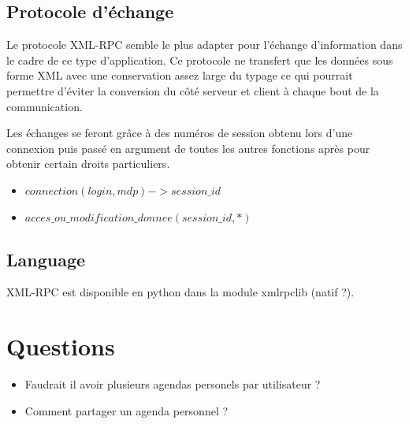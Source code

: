 \documentclass[a4paper,12pt]{article}
\begin{document}
\subsection{Protocole d'échange}

Le protocole XML-RPC semble le plus adapter pour l'échange d'information dans le cadre de ce type d'application. Ce protocole ne transfert que les données sous forme XML avec une conservation assez large du typage ce qui pourrait permettre d'éviter la conversion du côté serveur et client à chaque bout de la communication.

Les échanges se feront grâce à des numéros de session obtenu lors d'une connexion puis passé en argument de toutes les autres fonctions après pour obtenir certain droits particuliers.

\begin{itemize}
	\item $connection(login, mdp) -> session\_id$
	\item $acces\_ou\_modification\_donnee(session\_id, *)$
\end{itemize}


\subsection{Language}

XML-RPC est disponible en python dans la module xmlrpclib (natif ?).

\section{Questions}

\begin{itemize}
	\item Faudrait il avoir plusieurs agendas personels par utilisateur ?
	\item Comment partager un agenda personnel ?
\end{itemize}
\end{document}
